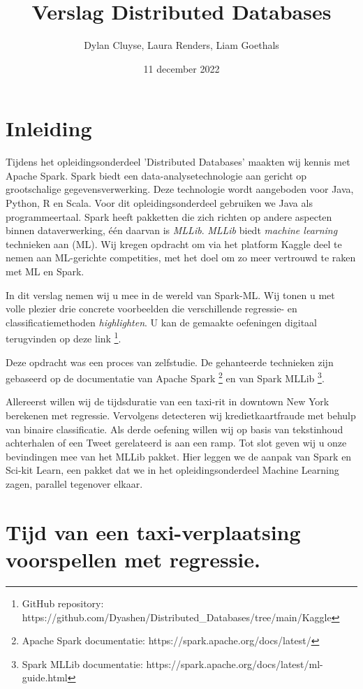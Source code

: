 \documentclass[a4paper,10pt,twoside]{report}
\title{Verslag Distributed Databases}
\author{Dylan {Cluyse}, Laura {Renders}, Liam {Goethals}}
\date{11 december 2022}
\begin{document}
\maketitle

\tableofcontents

\chapter{Inleiding}

Tijdens het opleidingsonderdeel 'Distributed Databases' maakten wij kennis met Apache Spark. Spark biedt een data-analysetechnologie aan gericht op grootschalige gegevensverwerking. Deze technologie wordt aangeboden voor Java, Python, R en Scala. Voor dit opleidingsonderdeel gebruiken we Java als programmeertaal. Spark heeft pakketten die zich richten op andere aspecten binnen dataverwerking, één daarvan is \textit{MLLib}. \textit{MLLib} biedt \textit{machine learning} technieken aan (ML). Wij kregen opdracht om via het platform Kaggle deel te nemen aan ML-gerichte competities, met het doel om zo meer vertrouwd te raken met ML en Spark.

In dit verslag nemen wij u mee in de wereld van Spark-ML. Wij tonen u met volle plezier drie concrete voorbeelden die verschillende regressie- en classificatiemethoden \textit{highlighten}. U kan de gemaakte oefeningen digitaal terugvinden op deze link \footnote{GitHub repository: https://github.com/Dyashen/Distributed\_Databases/tree/main/Kaggle}. 

Deze opdracht was een proces van zelfstudie. De gehanteerde technieken zijn gebaseerd op de documentatie van Apache Spark \footnote{Apache Spark documentatie: https://spark.apache.org/docs/latest/} en van Spark MLLib \footnote{Spark MLLib documentatie: https://spark.apache.org/docs/latest/ml-guide.html}.

Allereerst willen wij de tijdsduratie van een taxi-rit in downtown New York berekenen met regressie. Vervolgens detecteren wij kredietkaartfraude met behulp van binaire classificatie. Als derde oefening willen wij op basis van tekstinhoud achterhalen of een Tweet gerelateerd is aan een ramp. Tot slot geven wij u onze bevindingen mee van het MLLib pakket. Hier leggen we de aanpak van Spark en Sci-kit Learn, een pakket dat we in het opleidingsonderdeel Machine Learning zagen, parallel tegenover elkaar.

\chapter{Tijd van een taxi-verplaatsing voorspellen met regressie.}
\end{document}
